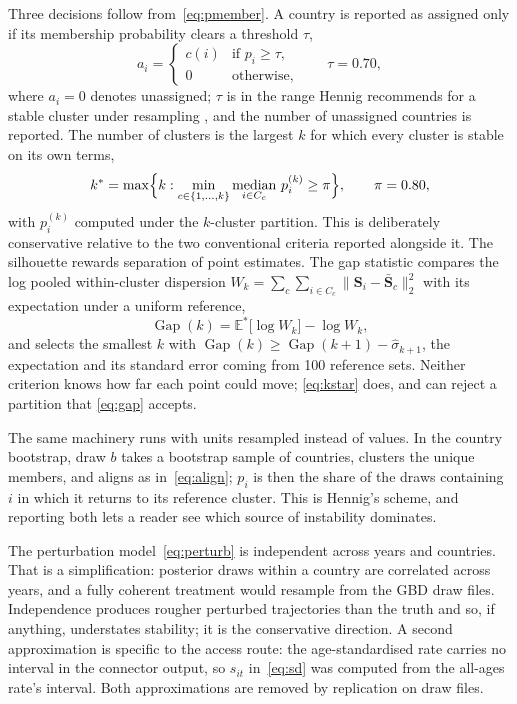 \documentclass[11pt,a4paper]{article}
\DeclareMathOperator{\median}{median}
\DeclareMathOperator{\Gap}{Gap}
\newcommand{\bS}{\mathbf{S}}
\begin{document}
Three decisions follow from~\eqref{eq:pmember}. A country is reported as assigned only if its membership probability clears a threshold $\tau$,
\begin{equation}\label{eq:assign}
a_i = \begin{cases} c(i) & \text{if } p_i \geq \tau, \\ 0 & \text{otherwise,} \end{cases} \qquad \tau = 0.70,
\end{equation}
where $a_i = 0$ denotes unassigned; $\tau$ is in the range Hennig recommends for a stable cluster under resampling \citep{hennig2007}, and the number of unassigned countries is reported. The number of clusters is the largest $k$ for which every cluster is stable on its own terms,
\begin{equation}\label{eq:kstar}
k^{*} = \max\Bigl\{ k : \min_{c \in \{1,\ldots,k\}} \median_{i \in C_c}\, p^{(k)}_i \geq \pi \Bigr\}, \qquad \pi = 0.80,
\end{equation}
with $p^{(k)}_i$ computed under the $k$-cluster partition. This is deliberately conservative relative to the two conventional criteria reported alongside it. The silhouette \citep{rousseeuw1987} rewards separation of point estimates. The gap statistic \citep{tibshirani2001} compares the log pooled within-cluster dispersion $W_k = \sum_c \sum_{i \in C_c} \lVert \bS_i - \bar{\bS}_c \rVert_2^2$ with its expectation under a uniform reference,
\begin{equation}\label{eq:gap}
\Gap(k) = \mathbb{E}^{*}\bigl[\log W_k\bigr] - \log W_k,
\end{equation}
and selects the smallest $k$ with $\Gap(k) \geq \Gap(k+1) - \hat\sigma_{k+1}$, the expectation and its standard error coming from 100 reference sets. Neither criterion knows how far each point could move; \eqref{eq:kstar} does, and can reject a partition that \eqref{eq:gap} accepts.

The same machinery runs with units resampled instead of values. In the country bootstrap, draw $b$ takes a bootstrap sample of countries, clusters the unique members, and aligns as in~\eqref{eq:align}; $p_i$ is then the share of the draws containing $i$ in which it returns to its reference cluster. This is Hennig's scheme, and reporting both lets a reader see which source of instability dominates.

The perturbation model~\eqref{eq:perturb} is independent across years and countries. That is a simplification: posterior draws within a country are correlated across years, and a fully coherent treatment would resample from the GBD draw files. Independence produces rougher perturbed trajectories than the truth and so, if anything, understates stability; it is the conservative direction. A second approximation is specific to the access route: the age-standardised rate carries no interval in the connector output, so $s_{it}$ in~\eqref{eq:sd} was computed from the all-ages rate's interval. Both approximations are removed by replication on draw files.
\end{document}
